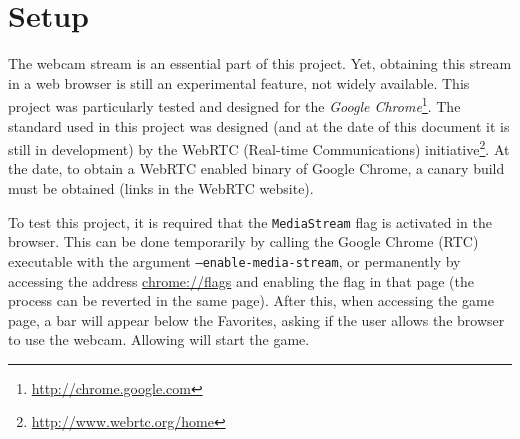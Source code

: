 \section{Setup}
\label{sec:setup}

The webcam stream is an essential part of this project. Yet, obtaining this stream in a web browser is still an experimental feature, not widely available. This project was particularly tested and designed for the \textit{Google Chrome}\footnote{\url{http://chrome.google.com}}. The standard used in this project was designed (and at the date of this document it is still in development) by the WebRTC (Real-time Communications) initiative\footnote{\url{http://www.webrtc.org/home}}. At the date, to obtain a WebRTC enabled binary of Google Chrome, a canary build must be obtained (links in the WebRTC website).

To test this project, it is required that the \texttt{MediaStream} flag is activated in the browser. This can be done temporarily by calling the Google Chrome (RTC) executable with the argument \texttt{--enable-media-stream}, or permanently by accessing the address \url{chrome://flags} and enabling the flag in that page (the process can be reverted in the same page). After this, when accessing the game page, a bar will appear below the Favorites, asking if the user allows the browser to use the webcam. Allowing will start the game.
